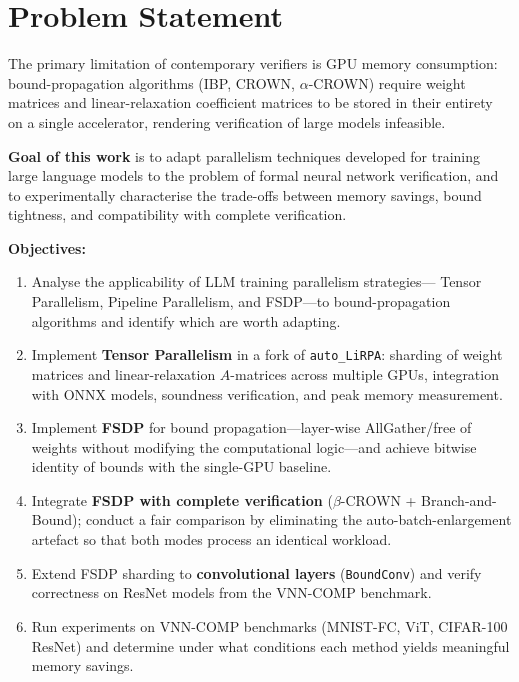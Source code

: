 \section{Problem Statement}

The primary limitation of contemporary verifiers is GPU memory consumption:
bound-propagation algorithms (IBP, CROWN, $\alpha$-CROWN) require weight
matrices and linear-relaxation coefficient matrices to be stored in their
entirety on a single accelerator, rendering verification of large models
infeasible.

\textbf{Goal of this work} is to adapt parallelism techniques developed for
training large language models to the problem of formal neural network
verification, and to experimentally characterise the trade-offs between
memory savings, bound tightness, and compatibility with complete verification.

\textbf{Objectives:}
\begin{enumerate}
    \item Analyse the applicability of LLM training parallelism strategies---
    Tensor Parallelism, Pipeline Parallelism, and FSDP---to bound-propagation
    algorithms and identify which are worth adapting.

    \item Implement \textbf{Tensor Parallelism} in a fork of
    \texttt{auto\_LiRPA}: sharding of weight matrices and linear-relaxation
    $A$-matrices across multiple GPUs, integration with ONNX models, soundness
    verification, and peak memory measurement.

    \item Implement \textbf{FSDP} for bound propagation---layer-wise
    AllGather/free of weights without modifying the computational
    logic---and achieve bitwise identity of bounds with the single-GPU baseline.

    \item Integrate \textbf{FSDP with complete verification}
    ($\beta$-CROWN + Branch-and-Bound); conduct a fair comparison by
    eliminating the auto-batch-enlargement artefact so that both modes
    process an identical workload.

    \item Extend FSDP sharding to \textbf{convolutional layers}
    (\texttt{BoundConv}) and verify correctness on ResNet models from
    the VNN-COMP benchmark.

    \item Run experiments on VNN-COMP benchmarks (MNIST-FC, ViT,
    CIFAR-100 ResNet) and determine under what conditions each method
    yields meaningful memory savings.
\end{enumerate}
